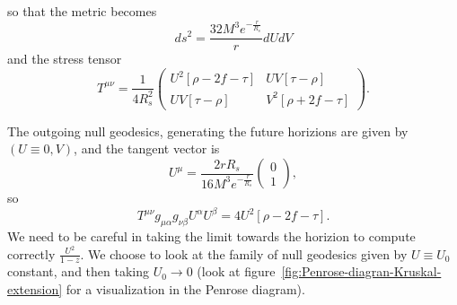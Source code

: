 so that the metric becomes
\[
    ds^2 = \frac{32M^3e^{-\frac{r}{R_s}}}{r}dUdV
\]
and the stress tensor
\[
    T^{\mu\nu} = \frac{1}{4R_s^2}
    \begin{pmatrix}
        U^2 \left[\rho - 2f - \tau \right] &
        UV\left[\tau - \rho\right] \\ 
        UV\left[\tau - \rho\right] &
        V^2 \left[\rho + 2f - \tau \right]
    \end{pmatrix}.
\]


The outgoing null geodesics, generating the future horizions are given by \((U \equiv 0, V)\), and the tangent vector is 
\[
U^{\mu} = \frac{2rR_s}{16M^3e^{-\frac{r}{R_s}}} \begin{pmatrix}
    0 \\ 1
\end{pmatrix},
\]
so
\[
   T^{\mu\nu}g_{\mu\alpha}g_{\nu\beta}U^{\alpha}U^{\beta}  = 
    4U^2\left[\rho - 2f - \tau \right].
\]
We need to be careful in taking the limit towards the horizion to compute correctly \(\frac{U^2}{1 - z}\). We choose to look at the family of null geodesics given by \(U \equiv U_0\) constant, and then taking \(U_0 \rightarrow 0\) (look at figure~\ref{fig:Penrose-diagran-Kruskal-extension} for a visualization in the Penrose diagram). 

